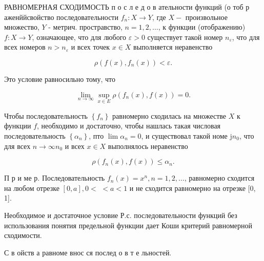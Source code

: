 \documentclass[10pt]{article}
\begin{document}
РАВНОМЕРНАЯ СХОДИМОСТЬ п о с л е д о в ательности функций (о тоб р аженййсвойство последовательности $f_{n}: X \rightarrow Y$, где $X-$ произвольное множество, $Y$ - метрич. простравство, $n=1,2, \ldots$, к функции (отображению) $f: X \rightarrow Y$, означающее, что для любого $\varepsilon>0$ существует такой номер $n_{\varepsilon}$, что для всех номеров $n>n_{\varepsilon}$ и всех точек $x \in X$ выполняется неравенство



\[

\rho\left(f(x), f_{n}(x)\right)<\varepsilon .

\]



Это условие равносильно тому, что



\[

\lim _{n \rightarrow \infty} \sup _{x \in E} \rho\left(f_{n}(x), f(x)\right)=0 .

\]



Чтобы последовательность $\left\{f_{n}\right\}$ равномерно сходилась на множестве $X$ к функции $f$, необходимо и достаточно, чтобы нашлась такая числовая последовательность $\left\{\alpha_{n}\right\}$, пто $\lim \alpha_{n}=0$, и существовал такой номе $\mathrm{j} n_{0}$, что для всех $n \rightarrow \infty n_{0}$ и всех $x \in X$ выполнялось неравенство



\[

\rho\left(f_{n}(x), f(x)\right) \leqslant \alpha_{n} .

\]



П р и ме р. Последовательность $f_{n}(x)=x^{n}, n=1,2, \ldots$, равномерно сходится на любом отрезке $[0, a], 0<$ $<a<1$ и не сходится равномерно на отрезке [0, 1].



Необходимое и достаточное условие Р.с. последовательности функций без использования понятия предельной функции дает Коши критерий равномерной сходимости.



С в ойств а равноме внос ся послед о в т е льностей.
\end{document}
